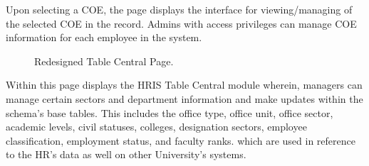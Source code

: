     Upon selecting a COE, the page displays the interface for viewing/managing of the selected COE in the record. Admins with access privileges can manage COE information for each employee in the system.

    \begin{figure}[H]
        \centering
        \caption{Redesigned Table Central Page.}
        \label{fig:app-table-central}
    \end{figure}

    Within this page displays the HRIS Table Central module wherein, managers can manage certain sectors and department information and make updates within the schema's base tables. This includes the office type, office unit, office sector, academic levels, civil statuses, colleges, designation sectors, employee classification, employment status, and faculty ranks. which are used in reference to the HR's data as well on other University's systems.

